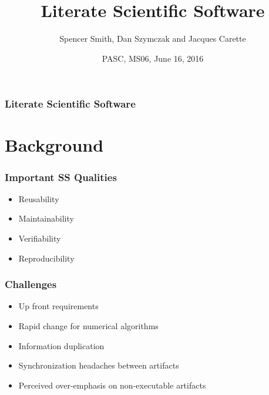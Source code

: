 \documentclass{beamer}
\title[\pgfuseimage{logo}] %
{Literate Scientific Software}
\author[Slide \thepage~of \pageref{TotPages}] %
{Spencer Smith, Dan Szymczak  and Jacques Carette}
\institute[McMaster University] %
{
  Computing and Software Department\\
  Faculty of Engineering\\
  McMaster University
}
\date[Jan 12, 2016] %
{PASC, MS06, June 16, 2016}
\begin{document}
\begin{frame}

\titlepage

\end{frame}


\begin{frame}

\frametitle{Literate Scientific Software}
\tableofcontents


\end{frame}


\section[Background]{Background}



\begin{frame}

\frametitle{Important SS Qualities}

\begin{itemize}
\item Reusability
\item Maintainability
\item Verifiability
\item Reproducibility
\end{itemize}

\end{frame}


\begin{frame}

\frametitle{Challenges}

\begin{itemize}
\item Up front requirements
\item Rapid change for numerical algorithms
\item Information duplication
\item Synchronization headaches between artifacts
\item Perceived over-emphasis on non-executable artifacts
\end{itemize}
\end{frame}
\end{document}
